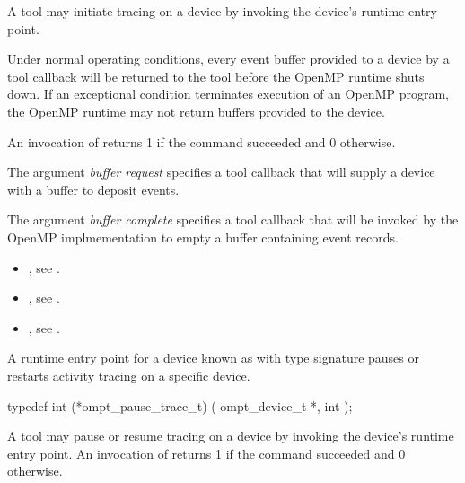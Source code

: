 \descr
A tool may initiate tracing on a device by invoking the device's 
runtime entry point.

Under normal operating conditions, every event buffer provided to
a device by a tool callback will be returned to the tool
before the OpenMP runtime shuts down.
If an exceptional condition terminates  execution of an OpenMP
program, the OpenMP runtime may not return buffers provided to the
device.

An invocation of  returns 1 if the command
succeeded and 0 otherwise.

\argdesc

\devicedesc

The argument \emph{buffer request} specifies a tool callback
that will supply a device with a buffer to deposit events.

The argument \emph{buffer complete} specifies a tool callback
that will be invoked by the OpenMP implmementation to empty a buffer
containing event records.

\crossreferences
\begin{itemize}
\item {},
see .
\item {},
see .
\item {},
see .
\end{itemize}

\label{sec:ompt_pause_trace_t}

\summary
A runtime entry point for a device known as 
with type signature 
pauses or restarts activity tracing on a specific device.

\begin{ccppspecific}
\begin{omptInquiry}
typedef int (*ompt_pause_trace_t) (
  ompt_device_t *,
  int 
);
\end{omptInquiry}
\end{ccppspecific}

\descr

A tool may pause or resume tracing on a device by invoking the device's
 runtime entry point.
An invocation of  returns 1 if the command
succeeded and 0 otherwise.

